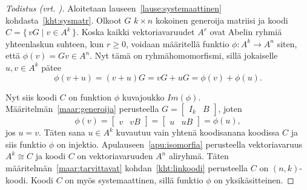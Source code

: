 \documentclass[a4paper,12pt,leqno,oneside]{report} %
\theoremstyle{plain}
\theoremstyle{plain}
\theoremstyle{definition}
\theoremstyle{remark}
\numberwithin{equation}{chapter}
\begin{document}
    \begin{proof}[Todistus \upshape(vrt. {\cite[s.~498]{PA}})]\label{tod:systemaattinen}
        Aloitetaan lauseen~\ref{lause:systemaattinen} kohdasta~\ref{kht:sysmatr}. Olkoot $G$ $k \times n$ kokoinen generoija matriisi ja koodi $C = \{\, vG \mid v \in A^k\,\}$. Koska kaikki vektoriavaruudet $A^r$ ovat Abelin ryhmiä yhteenlaskun suhteen, kun $r \ge 0$, voidaan määritellä funktio $\phi: A^k \rightarrow A^n$ siten, että $\phi(v) = Gv \in A^n$. Nyt tämä on ryhmähomomorfismi, sillä jokaiselle $u, v \in A^k$ pätee
        \[
            \phi(v + u) = (v + u)G = vG + uG = \phi(v) + \phi(u).
        \]

        Nyt siis koodi $C$ on funktion $\phi$ kuvajoukko $Im(\phi)$. Määritelmän~\ref{maar:generoija} perusteella
        $G = 
        \begin{bmatrix}
            I_k & B
        \end{bmatrix}$, joten
        \[
            \phi(v) =
            \begin{bmatrix}
                v & vB
            \end{bmatrix}
            =
            \begin{bmatrix}
                u & uB
            \end{bmatrix}
            = \phi(u),
        \]
        jos $u = v$. Täten sana $u \in A^k$ kuvautuu vain yhtenä koodisanana koodissa $C$ ja siis funktio $\phi$ on injektio. Apulauseen~\ref{apu:isomorfia} perusteella vektoriavaruus $A^k \cong C$ ja koodi $C$ on vektoriavaruuden $A^n$ aliryhmä. Täten määritelmän~\ref{maar:tarvittavat} kohdan~\ref{kht:linkoodi} perusteella $C$ on $(n, k)$-koodi. Koodi $C$ on myös systemaattinen, sillä funktio $\phi$ on yksikäsitteinen.


\end{proof}
\end{document}
